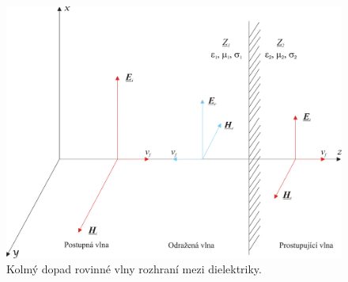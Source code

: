\begin{figure}[!h]
	\centering
	\includegraphics[width=13.5cm]{evlny_dielektricke_rozhrani.png}
	\caption{Kolmý dopad rovinné vlny rozhraní mezi dielektriky.}
	\label{obr:evlny_dielektricke_rozhrani}
\end{figure}

